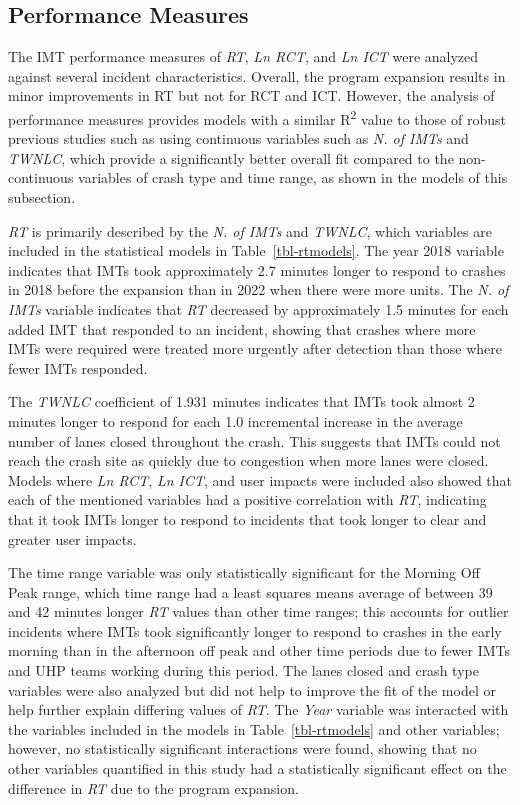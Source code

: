 \documentclass[
  letterpaper,
  authoryear]{elsarticle}
\begin{document}
\subsection{Performance Measures}\label{performance-measures}

The IMT performance measures of \emph{RT}, \emph{Ln RCT}, and \emph{Ln
ICT} were analyzed against several incident characteristics. Overall,
the program expansion results in minor improvements in RT but not for
RCT and ICT. However, the analysis of performance measures provides
models with a similar R\textsuperscript{2} value to those of robust
previous studies such as \citet{mumtarin_traffic_2023} using continuous
variables such as \emph{N. of IMTs} and \emph{TWNLC}, which provide a
significantly better overall fit compared to the non-continuous
variables of crash type and time range, as shown in the models of this
subsection.

\emph{RT} is primarily described by the \emph{N. of IMTs} and
\emph{TWNLC}, which variables are included in the statistical models in
Table~\ref{tbl-rtmodels}. The year 2018 variable indicates that IMTs
took approximately 2.7 minutes longer to respond to crashes in 2018
before the expansion than in 2022 when there were more units. The
\emph{N. of IMTs} variable indicates that \emph{RT} decreased by
approximately 1.5 minutes for each added IMT that responded to an
incident, showing that crashes where more IMTs were required were
treated more urgently after detection than those where fewer IMTs
responded.

The \emph{TWNLC} coefficient of 1.931 minutes indicates that IMTs took
almost 2 minutes longer to respond for each 1.0 incremental increase in
the average number of lanes closed throughout the crash. This suggests
that IMTs could not reach the crash site as quickly due to congestion
when more lanes were closed. Models where \emph{Ln RCT}, \emph{Ln ICT},
and user impacts were included also showed that each of the mentioned
variables had a positive correlation with \emph{RT}, indicating that it
took IMTs longer to respond to incidents that took longer to clear and
greater user impacts.

The time range variable was only statistically significant for the
Morning Off Peak range, which time range had a least squares means
average of between 39 and 42 minutes longer \emph{RT} values than other
time ranges; this accounts for outlier incidents where IMTs took
significantly longer to respond to crashes in the early morning than in
the afternoon off peak and other time periods due to fewer IMTs and UHP
teams working during this period. The lanes closed and crash type
variables were also analyzed but did not help to improve the fit of the
model or help further explain differing values of \emph{RT}. The
\emph{Year} variable was interacted with the variables included in the
models in Table~\ref{tbl-rtmodels} and other variables; however, no
statistically significant interactions were found, showing that no other
variables quantified in this study had a statistically significant
effect on the difference in \emph{RT} due to the program expansion.
\end{document}
